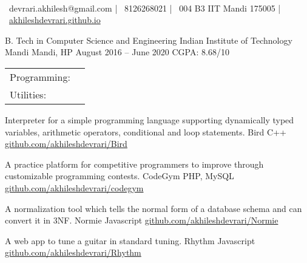 \documentclass[]{awesome-cv}
\begin{document}
    
\begin{center}
	  \\
	\vspace{2mm}
	{\faEnvelope\ devrari.akhilesh@gmail.com} | {\faMobile\ 8126268021} | {\faMapMarker\ 004 B3 IIT Mandi 175005} | {\faLink\ \href{https://akhileshdevrari.github.io/}{akhileshdevrari.github.io}}
\end{center}
\begin{cventries}
	\cventry
	{B. Tech in Computer Science and Engineering}
	{Indian Institute of Technology Mandi}
	{Mandi, HP}
	{August 2016 – June 2020}
	{CGPA: 8.68/10}
\end{cventries}


\begin{cventries}
	\vspace{-4mm}
	\cventry
	{}
	{\def\arraystretch{1.15}{\begin{tabular}{ l l }
		Programming:  & {\skill{ Comfortable: C/C++, Javascript \hspace{1cm} Less experience: PHP, Python}} \\
		Utilities:  & {\skill{ MySQL, Git, Linux shell utilities}} \\
		\end{tabular}}}
	{}
	{}
	{}
\end{cventries}

\vspace{-7mm}
\begin{cventries}
	\cventry
	{Interpreter for a simple programming language supporting dynamically typed variables, arithmetic operators, conditional and loop statements.}
	{Bird}
	{C++}
	{\href{https://github.com/akhileshdevrari/Bird}{github.com/akhileshdevrari/Bird}}
	{}
	
	\vspace{-5mm}
	\cventry
	{A practice platform for competitive programmers to improve through customizable programming contests.}
	{CodeGym}
	{PHP, MySQL}
	{\href{https://github.com/akhileshdevrari/codegym}{github.com/akhileshdevrari/codegym}}
	{}
	
	
	\vspace{-5mm}
	\cventry
	{A normalization tool which tells the normal form of a database schema and can convert it in 3NF.}
	{Normie}
	{Javascript}
	{\href{https://github.com/akhileshdevrari/Normie}{github.com/akhileshdevrari/Normie}}
	{}
	
	\vspace{-5mm}
	\cventry
	{A web app to tune a guitar in standard tuning.}
	{Rhythm}
	{Javascript}
	{\href{https://github.com/akhileshdevrari/Rhythm}{github.com/akhileshdevrari/Rhythm}}
	{}
	
\end{cventries}
\end{document}
